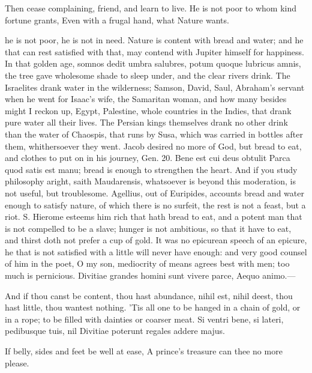 {Then cease complaining, friend, and learn to live.
He is not poor to whom kind fortune grants,
Even with a frugal hand, what Nature wants.

he is not poor, he is not in need. Nature is content with bread
and water; and he that can rest satisfied with that, may contend with
Jupiter himself for happiness. In that golden age, somnos dedit
umbra salubres, potum quoque lubricus amnis, the tree gave wholesome
shade to sleep under, and the clear rivers drink. The Israelites drank
water in the wilderness; Samson, David, Saul, Abraham's servant when he
went for Isaac's wife, the Samaritan woman, and how many besides might
I reckon up, Egypt, Palestine, whole countries in the Indies,
that drank pure water all their lives. The Persian kings
themselves drank no other drink than the water of Chaospis, that runs
by Susa, which was carried in bottles after them, whithersoever they
went. Jacob desired no more of God, but bread to eat, and clothes to
put on in his journey, Gen.  20. Bene est cui deus obtulit Parca
quod satis est manu; bread is enough to strengthen the heart. And
if you study philosophy aright, saith  Maudarensis, whatsoever is
beyond this moderation, is not useful, but troublesome. Agellius,
out of Euripides, accounts bread and water enough to satisfy nature, of
which there is no surfeit, the rest is not a feast, but a riot.
S. Hierome esteems him rich that hath bread to eat, and a potent
man that is not compelled to be a slave; hunger is not ambitious, so
that it have to eat, and thirst doth not prefer a cup of gold. It was
no epicurean speech of an epicure, he that is not satisfied with a
little will never have enough: and very good counsel of him in the
poet, O my son, mediocrity of means agrees best with men; too
much is pernicious.
Divitiae grandes homini sunt vivere parce,
Aequo animo.---

And if thou canst be content, thou hast abundance, nihil est, nihil
deest, thou hast little, thou wantest nothing. 'Tis all one to be
hanged in a chain of gold, or in a rope; to be filled with dainties or
coarser meat.
Si ventri bene, si lateri, pedibusque tuis, nil
Divitiae poterunt regales addere majus.

If belly, sides and feet be well at ease,
A prince's treasure can thee no more please.

}
